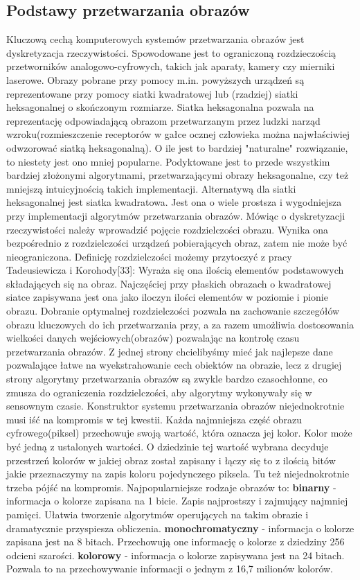 \subsection{Podstawy przetwarzania obrazów}
Kluczową cechą komputerowych systemów przetwarzania obrazów jest dyskretyzacja rzeczywistości. Spowodowane jest to ograniczoną rozdzieczością przetworników analogowo-cyfrowych, takich jak aparaty, kamery czy mierniki laserowe. Obrazy pobrane przy pomocy m.in. powyższych urządzeń są reprezentowane przy pomocy siatki kwadratowej lub (rzadziej) siatki heksagonalnej o skończonym rozmiarze. Siatka heksagonalna pozwala na reprezentację odpowiadającą obrazom przetwarzanym przez ludzki narząd wzroku(rozmieszczenie receptorów w gałce ocznej człowieka można najwłaściwiej odwzorować siatką heksagonalną). O ile jest to bardziej "naturalne" rozwiązanie, to niestety jest ono mniej popularne. Podyktowane jest to przede wszystkim bardziej złożonymi algorytmami, przetwarzającymi obrazy heksagonalne, czy też mniejszą intuicyjnością takich implementacji.
Alternatywą dla siatki heksagonalnej jest siatka kwadratowa. Jest ona o wiele prostsza i wygodniejsza przy implementacji algorytmów przetwarzania obrazów.
Mówiąc o dyskretyzacji rzeczywistości należy wprowadzić pojęcie rozdzielczości obrazu. Wynika ona bezpośrednio z rozdzielczości urządzeń pobierających obraz, zatem nie może być nieograniczona. Definicję rozdzielczości możemy przytoczyć z pracy Tadeusiewicza i Korohody[33]:
Wyraża się ona ilością elementów podstawowych składających się na obraz. Najczęściej
przy płaskich obrazach o kwadratowej siatce zapisywana jest ona jako iloczyn ilości elementów
w poziomie i pionie obrazu.
Dobranie optymalnej rozdzielczości pozwala na zachowanie szczegółów obrazu kluczowych do ich przetwarzania przy, a za razem umożliwia dostosowania wielkości danych wejściowych(obrazów) pozwalając na kontrolę czasu przetwarzania obrazów. Z jednej strony chcielibyśmy mieć jak najlepsze dane pozwalające łatwe na wyekstrahowanie cech obiektów na obrazie, lecz z drugiej strony algorytmy przetwarzania obrazów są zwykle bardzo czasochłonne, co zmusza do ograniczenia rozdzielczości, aby algorytmy wykonywały się w sensownym czasie. Konstruktor systemu przetwarzania obrazów niejednokrotnie musi iść na kompromis w tej kwestii.
Każda najmniejsza część obrazu cyfrowego(piksel) przechowuje swoją wartość, która oznacza jej kolor. Kolor może być jedną z ustalonych wartości. O dziedzinie tej wartość wybrana decyduje przestrzeń kolorów w jakiej obraz został zapisany i łączy się to z ilością bitów jakie przeznaczymy na zapis koloru pojedynczego piksela. Tu też niejednokrotnie trzeba pójść na kompromis. Najpopularniejsze rodzaje obrazów to:
\textbf{binarny} - informacja o kolorze zapisana na 1 bicie. Zapis najprostszy i zajmujący najmniej pamięci. Ułatwia tworzenie algorytmów operujących na takim obrazie i dramatycznie przyspiesza obliczenia.
\textbf{monochromatyczny} - informacja o kolorze zapisana jest na 8 bitach. Przechowują one informację o kolorze z dziedziny 256 odcieni szarości.
\textbf{kolorowy} - informacja o kolorze zapisywana jest na 24 bitach. Pozwala to na przechowywanie informacji o jednym z 16,7 milionów kolorów.



